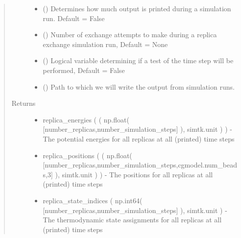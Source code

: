 \documentclass[letterpaper,12pt,english,openany,oneside]{sphinxmanual}
\begin{document}
\begin{fulllineitems}
\begin{quote}
\begin{description}
\begin{itemize}
\item {} 
 () \textendash{} Determines how much output is printed during a simulation run.  Default = False

\item {} 
 () \textendash{} Number of exchange attempts to make during a replica exchange simulation run, Default = None

\item {} 
 () \textendash{} Logical variable determining if a test of the time step will be performed, Default = False

\item {} 
 () \textendash{} Path to which we will write the output from simulation runs.

\end{itemize}

\item[{Returns}] \leavevmode
\begin{itemize}
\item {} 
replica\_energies (  ( np.float( {[}number\_replicas,number\_simulation\_steps{]} ), simtk.unit ) ) - The potential energies for all replicas at all (printed) time steps

\item {} 
replica\_positions (  ( np.float( {[}number\_replicas,number\_simulation\_steps,cgmodel.num\_beads,3{]} ), simtk.unit ) ) - The positions for all replicas at all (printed) time steps

\item {} 
replica\_state\_indices ( np.int64( {[}number\_replicas,number\_simulation\_steps{]} ), simtk.unit ) - The thermodynamic state assignments for all replicas at all (printed) time steps

\end{itemize}



\end{description}
\end{quote}
\end{fulllineitems}
\end{document}
